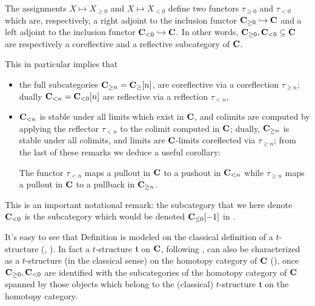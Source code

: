 \begin{remark}\label{trunfun}
The assignments $X\mapsto X_{\ge 0}$ and $X\mapsto X_{< 0}$ define two functors $\tau_{\ge 0}$ and $\tau_{<0}$ which are, respectively, a right adjoint to the inclusion functor $\textbf{C}_{\ge 0}\hookrightarrow \textbf{C}$ and a left adjoint to the inclusion functor $\textbf{C}_{<0}\hookrightarrow \textbf{C}$. In other words, $\textbf{C}_{\ge 0},\textbf{C}_{<0} \subseteq \textbf{C}$ are respectively \cite[\textbf{1.2.1.5\hyp{}8}]{LurieHA} a coreflective and a reflective subcategory of $\textbf{C}$.

This in particular implies that 
\begin{itemize}
\item the full subcategories $\textbf{C}_{\ge n}=\textbf{C}_\ge[n]$, are coreflective via a coreflection $\tau_{\ge n}$; dually $\textbf{C}_{<n}=\textbf{C}_{<0}[n]$ are reflective via a reflection  $\tau_{< n}$, 
\item $\textbf{C}_{< n}$ is stable under all limits which exist in $\textbf{C}$, and colimits are computed by applying the reflector $\tau_{< n}$ to the colimit computed in $\textbf{C}$; dually, $\textbf{C}_{\ge n}$ is stable under all colimits, and limits are $\textbf{C}$-limits coreflected via $\tau_{\ge n}$; from the last of these remarks we deduce a useful corollary: 
\begin{corollary}
The functor $\tau_{<n}$ maps a pullout in $\textbf{C}$ to a pushout in $\textbf{C}_{<n}$ while $\tau_{\geq n}$ maps a pullout in $\textbf{C}$ to a pullback in $\textbf{C}_{\geq n}$.
\end{corollary}
\end{itemize}
\end{remark}
\begin{notat}\marginnote{\textdbend}
This is an important notational remark: the subcategory that we here denote $\textbf{C}_{<0}$ is the subcategory which would be denoted $\textbf{C}_{\leq 0}[-1]$ in \cite{LurieHA}.
\end{notat}
\begin{remark}\label{our.1241}
It's easy to see that Definition  is modeled on the classical definition of a $t$\hyp{}structure (\cite{Kashiwara}, \cite{BBDPervers}). In fact a $t$\hyp{}structure $\mathfrak{t}$ on $\textbf{C}$, following \cite{LurieHA}, can also be characterized as a $t$\hyp{}structure (in the classical sense) on the homotopy category of $\textbf{C}$ (\cite[Def. \textbf{1.2.1.4}]{LurieHA}), once $\textbf{C}_{\ge 0}, \textbf{C}_{<0}$ are identified with the subcategories of the homotopy category of $\textbf{C}$ spanned by those objects which belong to the (classical) $t$\hyp{}structure $\mathfrak{t}$ on the homotopy category. \end{remark}
